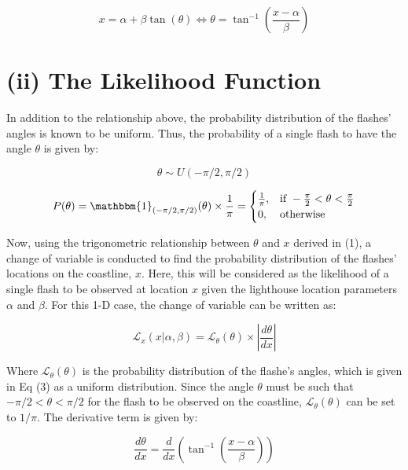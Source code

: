 \documentclass[12pt]{report} %
\begin{document}
\begin{equation}
    x = \alpha + \beta \tan(\theta) \iff \theta = \tan^{-1}\left(\frac{x - \alpha}{\beta}\right)
\end{equation}

\chapter{(ii) The Likelihood Function}

In addition to the relationship above, the probability distribution of the flashes' angles is known to be uniform. Thus, the probability of a single flash to have the angle $\theta$ is given by:

\begin{equation}
    \theta \sim U(-\pi/2, \pi/2)
\end{equation}

\begin{equation}
    P(\theta) = \mathbbm{1}_{(-\pi/2, \pi/2)}(\theta) \times \frac{1}{\pi} = \begin{cases} \frac{1}{\pi}, & \text{if } -\frac{\pi}{2} < \theta < \frac{\pi}{2} \\ 0, & \text{otherwise} \end{cases}
\end{equation}

Now, using the trigonometric relationship between $\theta$ and $x$ derived in (1), a change of variable is conducted to find the probability distribution of the flashes' locations on the coastline, $x$. Here, this will be considered as the likelihood of a single flash to be observed at location $x$ given the lighthouse location parameters $\alpha$ and $\beta$. For this 1-D case, the change of variable can be written as:

\begin{equation}
    \mathcal{L}_{x}(x|\alpha, \beta) = \mathcal{L}_{\theta}(\theta) \times \left| \frac{d\theta}{dx} \right|
\end{equation}

Where $\mathcal{L}_{\theta}(\theta)$ is the probability distribution of the flashe's angles, which is given in Eq (3) as a uniform distribution. Since the angle $\theta$ must be such that $-\pi/2 < \theta < \pi/2$ for the flash to be observed on the coastline, $\mathcal{L}_{\theta}(\theta)$ can be set to $1/\pi$. The derivative term is given by:

\begin{equation}
    \frac{d\theta}{dx} = \frac{d}{dx} (\tan^{-1}\left(\frac{x - \alpha}{\beta}\right) )
\end{equation}
\end{document}
